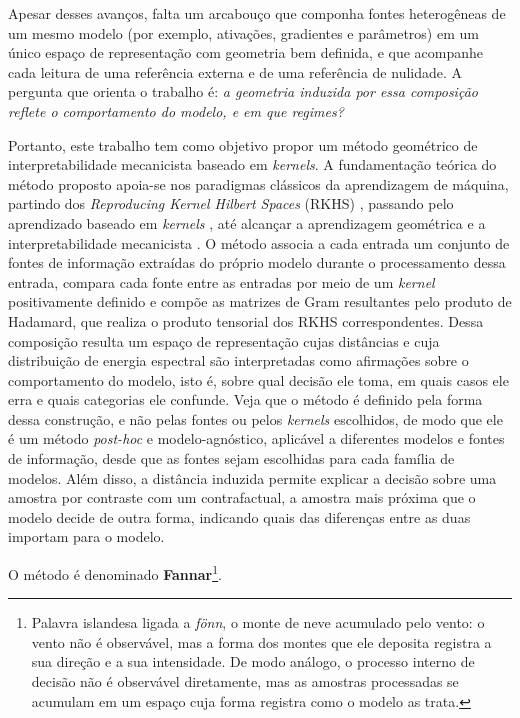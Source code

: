 Apesar desses avanços, falta um arcabouço que componha fontes heterogêneas de um mesmo modelo (por exemplo, ativações, gradientes e parâmetros) em um único espaço de representação com geometria bem definida, e que acompanhe cada leitura de uma referência externa e de uma referência de nulidade. A pergunta que orienta o trabalho é: \emph{a geometria induzida por essa composição reflete o comportamento do modelo, e em que regimes?}

Portanto, este trabalho tem como objetivo propor um método geométrico de interpretabilidade mecanicista baseado em \textit{kernels}. A fundamentação teórica do método proposto apoia-se nos paradigmas clássicos da aprendizagem de máquina, partindo dos \textit{Reproducing Kernel Hilbert Spaces} (RKHS) \citep{Aronszajn1950}, passando pelo aprendizado baseado em \textit{kernels} \citep{Scholkopf2001}, até alcançar a aprendizagem geométrica \citep{Cao2020} e a interpretabilidade mecanicista \citep{Kastner2024} . O método associa a cada entrada um conjunto de fontes de informação extraídas do próprio modelo durante o processamento dessa entrada, compara cada fonte entre as entradas por meio de um \textit{kernel} positivamente definido e compõe as matrizes de Gram resultantes pelo produto de Hadamard, que realiza o produto tensorial dos RKHS correspondentes. Dessa composição resulta um espaço de representação cujas distâncias e cuja distribuição de energia espectral são interpretadas como afirmações sobre o comportamento do modelo, isto é, sobre qual decisão ele toma, em quais casos ele erra e quais categorias ele confunde. Veja que o método é definido pela forma dessa construção, e não pelas fontes ou pelos \textit{kernels} escolhidos, de modo que ele é um método \textit{post-hoc} e modelo-agnóstico, aplicável a diferentes modelos e fontes de informação, desde que as fontes sejam escolhidas para cada família de modelos. Além disso, a distância induzida permite explicar a decisão sobre uma amostra por contraste com um contrafactual, a amostra mais próxima que o modelo decide de outra forma, indicando quais das diferenças entre as duas importam para o modelo.

O método é denominado \textbf{Fannar}\footnote{Palavra islandesa ligada a \textit{fönn}, o monte de neve acumulado pelo vento: o vento não é observável, mas a forma dos montes que ele deposita registra a sua direção e a sua intensidade. De modo análogo, o processo interno de decisão não é observável diretamente, mas as amostras processadas se acumulam em um espaço cuja forma registra como o modelo as trata.}.

